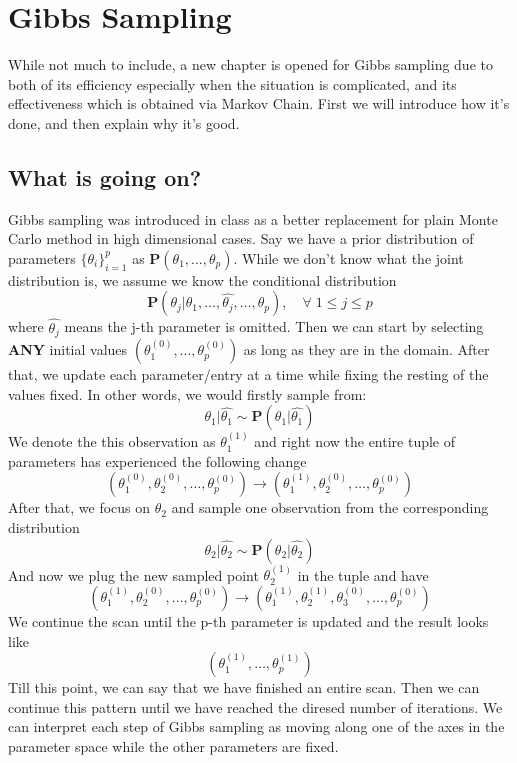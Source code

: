 \chapter{Gibbs Sampling}

While not much to include, a new chapter is opened for Gibbs sampling due to both of its efficiency especially when the situation is complicated, and its effectiveness which is obtained via Markov Chain. First we will introduce how it's done, and then explain why it's good. 

\section*{What is going on?}
Gibbs sampling was introduced in class as a better replacement for plain Monte Carlo method in high dimensional cases. Say we have a prior distribution of parameters $\{ \theta_i \}_{i=1}^p$ as $\mathbf{P}(\theta_1, \ldots, \theta_p)$. While we don't know what the joint distribution is, we assume we know the conditional distribution 
\begin{equation*}
    \mathbf{P}(\theta_j | \theta_1, \ldots, \hat{\theta_j}, \ldots, \theta_p),\quad \forall \; 1\leq j \leq p
\end{equation*}
where $\hat{\theta_j}$ means the j-th parameter is omitted. Then we can start by selecting \textbf{ANY} initial values $(\theta_1^{(0)}, \ldots, \theta_p^{(0)})$ as long as they are in the domain. After that, we update each parameter/entry at a time while fixing the resting of the values fixed. In other words, we would firstly sample from:
\begin{equation*}
    \theta_1 | \hat{\theta_1} \sim \mathbf{P}(\theta_1 | \hat{\theta_1})
\end{equation*}
We denote the this observation as $\theta_1^{(1)}$ and right now the entire tuple of parameters has experienced the following change
\begin{equation*}
    (\theta_1^{(0)}, \theta_2^{(0)}, \ldots, \theta_p^{(0)}) \rightarrow (\theta_1^{(1)}, \theta_2^{(0)}, \ldots, \theta_p^{(0)})
\end{equation*}
After that, we focus on $\theta_2$ and sample one observation from the corresponding distribution
\begin{equation*}
    \theta_2 | \hat{\theta_2} \sim \mathbf{P}(\theta_2 | \hat{\theta_2})
\end{equation*}
And now we plug the new sampled point $\theta_2^{(1)}$ in the tuple and have
\begin{equation*}
    (\theta_1^{(1)}, \theta_2^{(0)}, \ldots, \theta_p^{(0)}) \rightarrow (\theta_1^{(1)}, \theta_2^{(1)}, \theta_3^{(0)}, \ldots, \theta_p^{(0)})
\end{equation*}
We continue the scan until the p-th parameter is updated and the result looks like
\begin{equation*}
    (\theta_1^{(1)}, \ldots, \theta_p^{(1)})
\end{equation*}
Till this point, we can say that we have finished an entire scan. Then we can continue this pattern until we have reached the diresed number of iterations. We can interpret each step of Gibbs sampling as moving along one of the axes in the parameter space while the other parameters are fixed. 

